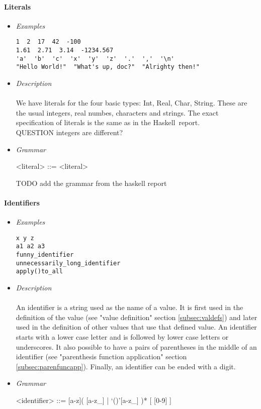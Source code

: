 \documentclass{article}
\def\H{Haskell}
\begin{document}
\paragraph{Literals}
\begin{itemize}

\item \textit{Examples}
\begin{verbatim}
1  2  17  42  -100
1.61  2.71  3.14  -1234.567
'a'  'b'  'c'  'x'  'y'  'z'  '.'  ','  '\n'
"Hello World!"  "What's up, doc?"  "Alrighty then!"
\end{verbatim}

\item \textit{Description} \\\\
We have literals for the four basic types: Int, Real, Char, String. These are the 
usual integers, real numbes, characters and strings. The exact specification of 
literals is the same as in the \H\ report.
\\QUESTION integers are different?

\item \textit{Grammar}
\begin{grammar}
<literal> ::= <literal>
\end{grammar}
TODO add the grammar from the haskell report

\end{itemize}


\paragraph{Identifiers}
\begin{itemize}

\item \textit{Examples}
\begin{verbatim}
x y z
a1 a2 a3 
funny_identifier 
unnecessarily_long_identifier
apply()to_all
\end{verbatim}

\item \textit{Description} \\\\
An identifier is a string used as the name of a value. It is first used in the
definition of the value (see "value definition" section \ref{subsec:valdefs})
and later used in the definition of other values that use that defined value.
An identifier starts with a lower case letter and is followed by lower case
letters or underscores. It also possible to have a pairs of parentheses in the
middle of an identifier (see "parenthesis function application" section
\ref{subsec:parenfuncapp}). Finally, an identifier can be ended with a digit.

\item \textit{Grammar}
\begin{grammar}
<identifier> ::= [a-z]( [a-z_] | `()'[a-z_] )* [ [0-9] ]
\end{grammar}

\end{itemize}
\end{document}
